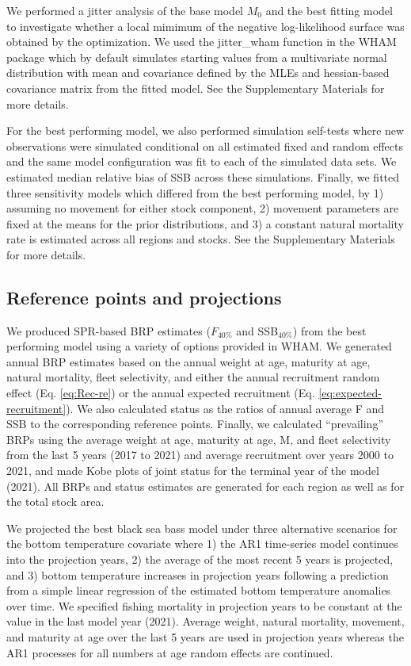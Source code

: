 \documentclass[
]{article}
\begin{document}
We performed a jitter analysis of the base model \(M_0\) and the best fitting model to investigate whether a local mimimum of the negative log-likelihood surface was obtained by the optimization. We used the jitter\_wham function in the WHAM package which by default simulates starting values from a multivariate normal distribution with mean and covariance defined by the MLEs and hessian-based covariance matrix from the fitted model. See the Supplementary Materials for more details.

For the best performing model, we also performed simulation self-tests where new observations were simulated conditional on all estimated fixed and random effects and the same model configuration was fit to each of the simulated data sets. We estimated median relative bias of SSB across these simulations. Finally, we fitted three sensitivity models which differed from the best performing model, by 1) assuming no movement for either stock component, 2) movement parameters are fixed at the means for the prior distributions, and 3) a constant natural mortality rate is estimated across all regions and stocks. See the Supplementary Materials for more details.

\hypertarget{reference-points-and-projections}{%
\subsection*{Reference points and projections}\label{reference-points-and-projections}}

We produced SPR-based BRP estimates (\(F_{40\%}\) and SSB\(_{40\%}\)) from the best performing model using a variety of options provided in WHAM. We generated annual BRP estimates based on the annual weight at age, maturity at age, natural mortality, fleet selectivity, and either the annual recruitment random effect (Eq. \ref{eq:Rec-re}) or the annual expected recruitment (Eq. \ref{eq:expected-recruitment}). We also calculated status as the ratios of annual average F and SSB to the corresponding reference points. Finally, we calculated ``prevailing'' BRPs using the average weight at age, maturity at age, M, and fleet selectivity from the last 5 years (2017 to 2021) and average recruitment over years 2000 to 2021, and made Kobe plots of joint status for the terminal year of the model (2021). All BRPs and status estimates are generated for each region as well as for the total stock area.

We projected the best black sea bass model under three alternative scenarios for the bottom temperature covariate where 1) the AR1 time-series model continues into the projection years, 2) the average of the most recent 5 years is projected, and 3) bottom temperature increases in projection years following a prediction from a simple linear regression of the estimated bottom temperature anomalies over time. We specified fishing mortality in projection years to be constant at the value in the last model year (2021). Average weight, natural mortality, movement, and maturity at age over the last 5 years are used in projection years whereas the AR1 processes for all numbers at age random effects are continued.
\end{document}
